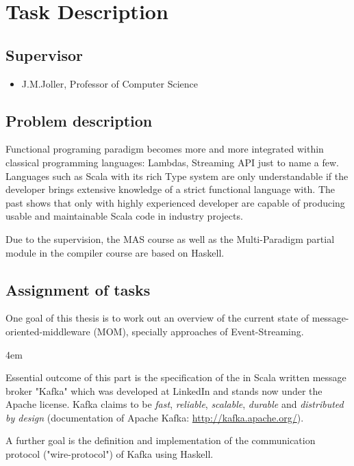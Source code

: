 \chapter{Task Description}
\section*{Supervisor}
\begin{itemize}
    \item J.M.Joller, Professor of Computer Science
\end{itemize}

\section*{Problem description}

Functional programing paradigm becomes more and more integrated within classical
programming languages: Lambdas, Streaming API just to name a few. Languages such
as Scala with its rich Type system are only understandable if the developer
brings extensive knowledge of a strict functional language with. The past shows
that only with highly experienced developer are capable of producing usable and
maintainable Scala code in industry projects.

Due to the supervision, the MAS course as well as the Multi-Paradigm partial
module in the compiler course are based on Haskell.

\section*{Assignment of tasks}

One goal of this thesis is to work out an overview of the current state of
message-oriented-middleware (MOM), specially approaches of Event-Streaming.

\par
\begingroup
\leftskip4em
\rightskip\leftskip

Essential outcome of this part is the specification of the in Scala written
message broker "Kafka" which was developed at LinkedIn and stands now under the
Apache license.  Kafka claims to be \textit{fast}, \textit{reliable},
\textit{scalable}, \textit{durable} and \textit{distributed by design}
(documentation of Apache Kafka: \url{http://kafka.apache.org/}).

\par
\endgroup

A further goal is the definition and implementation of the communication
protocol ("wire-protocol") of Kafka using Haskell.


